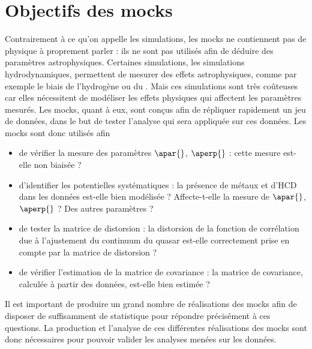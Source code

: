 \section{Objectifs des mocks}
Contrairement à ce qu'on appelle les simulations, les mocks ne contiennent pas de physique à proprement parler : ils ne sont pas utilisés afin de déduire des paramètres astrophysiques. Certaines simulations, les simulations hydrodynamiques, permettent de mesurer des effets astrophysiques, comme par exemple le biais de l'hydrogène ou du \lya{}. Mais ces simulations sont très coûteuses car elles nécessitent de modéliser les effets physiques qui affectent les paramètres mesurés.
Les mocks, quant à eux, sont conçus afin de répliquer rapidement un jeu de données, dans le but de tester l'analyse qui sera appliquée sur ces données.
Les mocks sont donc utilisés afin
\begin{itemize}[label=$\bullet$]
\item de vérifier la mesure des paramètres $\apar{}$, $\aperp{}$ : cette mesure est-elle non biaisée ?
\item d'identifier les potentielles systématiques : la présence de métaux et d'HCD dans les données est-elle bien modélisée ? Affecte-t-elle la mesure de $\apar{}$, $\aperp{}$ ? Des autres paramètres ?
\item de tester la matrice de distorsion : la distorsion de la fonction de corrélation due à l'ajustement du continuum du quasar est-elle correctement prise en compte par la matrice de distorsion ?
\item de vérifier l'estimation de la matrice de covariance : la matrice de covariance, calculée à partir des données, est-elle bien estimée ?
\end{itemize}
Il est important de produire un grand nombre de réalisations des mocks afin de disposer de suffisamment de statistique pour répondre précisément à ces questions. La production et l'analyse de ces différentes réalisations des mocks sont donc nécessaires pour pouvoir valider les analyses menées sur les données.

